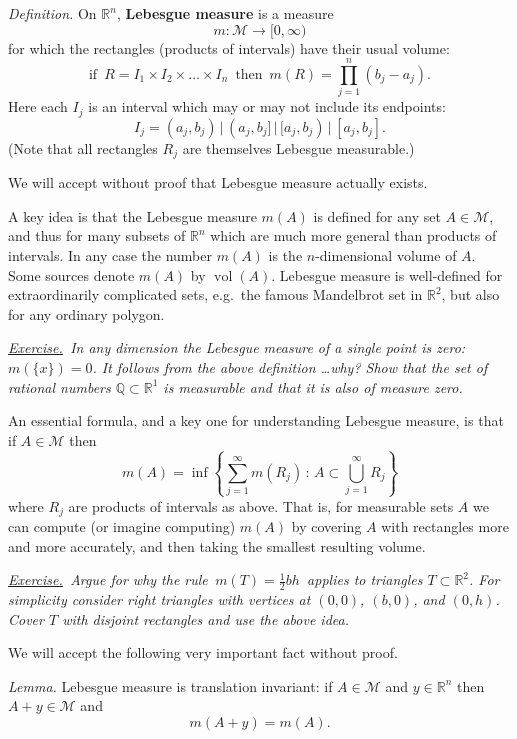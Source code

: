 \documentclass[12pt]{article}
\newcommand{\cM}{\mathcal{M}}
\newcommand{\QQ}{\mathbb{Q}}
\newcommand{\RR}{\mathbb{R}}
\newcommand{\defin}{\emph{Definition.}\,\,}
\newcommand{\lem}{\emph{Lemma.}\,\,}
\newcommand{\exer}[2]{\emph{\underline{Exercise.}\, #2} \vspace*{#1mm}}
\begin{document}
\defin On $\RR^n$, \textbf{Lebesgue measure} is a measure
	$$m : \cM \to [0,\infty)$$
for which the rectangles (products of intervals) have their usual volume:
	$$\text{if }\, R = I_1\times I_2 \times \dots \times I_n \, \text{ then } \, m(R) = \prod_{j=1}^n (b_j - a_j).$$
Here each $I_j$ is an interval which may or may not include its endpoints:
	$$I_j = (a_j,b_j) \,\Big|\, (a_j,b_j] \,\Big|\, [a_j,b_j) \,\Big|\, [a_j,b_j].$$
(Note that all rectangles $R_j$ are themselves Lebesgue measurable.)

We will accept without proof that Lebesgue measure actually exists.

A key idea is that the Lebesgue measure $m(A)$ is defined for any set $A\in\cM$, and thus for many subsets of $\RR^n$ which are much more general than products of intervals.  In any case the number $m(A)$ is the $n$-dimensional volume of $A$.  Some sources denote $m(A)$ by $\operatorname{vol}(A)$.  Lebesgue measure is well-defined for extraordinarily complicated sets, e.g.~the famous Mandelbrot set in $\RR^2$, but also for any ordinary polygon.

\exer{50}{In any dimension the Lebesgue measure of a single point is zero: $m(\{x\})=0$.  It follows from the above definition \dots why?  Show that the set of rational numbers $\QQ \subset \RR^1$ is measurable and that it is also of measure zero.}

An essential formula, and a key one for understanding Lebesgue measure, is that if $A\in\cM$ then
	$$m(A) = \inf \left\{\sum_{j=1}^\infty m(R_j) \,:\, A \subset \bigcup_{j=1}^\infty R_j\right\}$$
where $R_j$ are products of intervals as above.  That is, for measurable sets $A$ we can compute (or imagine computing) $m(A)$ by covering $A$ with rectangles more and more accurately, and then taking the smallest resulting volume.

\clearpage\newpage
\exer{60}{Argue for why the rule \,$m(T)=\frac{1}{2} b h$\, applies to triangles $T\subset \RR^2$.  For simplicity consider right triangles with vertices at $(0,0)$, $(b,0)$, and $(0,h)$.  Cover $T$ with disjoint rectangles and use the above idea.}

We will accept the following very important fact without proof.

\lem Lebesgue measure is translation invariant: if $A\in \cM$ and $y\in\RR^n$ then $A+y\in\cM$ and
	$$m(A+y) = m(A).$$

\end{document}
